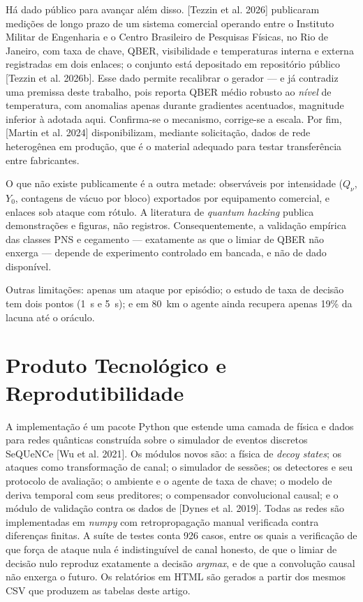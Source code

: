 \documentclass[12pt]{article}
\begin{document}
Há dado público para avançar além disso. [Tezzin et al. 2026] publicaram
medições de longo prazo de um sistema comercial operando entre o Instituto Militar
de Engenharia e o Centro Brasileiro de Pesquisas Físicas, no Rio de Janeiro, com
taxa de chave, QBER, visibilidade e temperaturas interna e externa registradas em
dois enlaces; o conjunto está depositado em repositório público
[Tezzin et al. 2026b]. Esse dado permite recalibrar o gerador --- e já contradiz
uma premissa deste trabalho, pois reporta QBER médio robusto ao \emph{nível} de
temperatura, com anomalias apenas durante gradientes acentuados, magnitude
inferior à adotada aqui. Confirma-se o mecanismo, corrige-se a escala. Por fim,
[Martin et al. 2024] disponibilizam, mediante solicitação, dados de rede
heterogênea em produção, que é o material adequado para testar transferência entre
fabricantes.

O que não existe publicamente é a outra metade: observáveis por intensidade
($Q_\nu$, $Y_0$, contagens de vácuo por bloco) exportados por equipamento
comercial, e enlaces sob ataque com rótulo. A literatura de \emph{quantum hacking}
publica demonstrações e figuras, não registros. Consequentemente, a validação
empírica das classes PNS e cegamento --- exatamente as que o limiar de QBER não
enxerga --- depende de experimento controlado em bancada, e não de dado
disponível.

Outras limitações: apenas um ataque por episódio; o estudo de taxa de decisão tem
dois pontos (1~s e 5~s); e em 80~km o agente ainda recupera apenas 19\% da lacuna
até o oráculo.

\section{Produto Tecnológico e Reprodutibilidade}

A implementação é um pacote Python que estende uma camada de física e dados para
redes quânticas construída sobre o simulador de eventos discretos SeQUeNCe
[Wu et al. 2021]. Os módulos novos são: a física de \emph{decoy states}; os
ataques como transformação de canal; o simulador de sessões; os detectores e seu
protocolo de avaliação; o ambiente e o agente de taxa de chave; o modelo de deriva
temporal com seus preditores; o compensador convolucional causal; e o módulo de
validação contra os dados de [Dynes et al. 2019]. Todas as redes
são implementadas em \emph{numpy} com retropropagação manual verificada contra
diferenças finitas. A suíte de testes conta 926 casos, entre os quais a verificação
de que força de ataque nula é indistinguível de canal honesto, de que o limiar de
decisão nulo reproduz exatamente a decisão \emph{argmax}, e de que a convolução
causal não enxerga o futuro. Os relatórios em HTML são gerados a partir dos mesmos
CSV que produzem as tabelas deste artigo.
\end{document}

